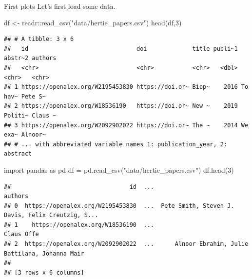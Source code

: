 \documentclass[
  10pt,
  ignorenonframetext,
  aspectratio=169]{beamer}
\newenvironment{Shaded}{\begin{snugshade}}{\end{snugshade}}
\newcommand{\DecValTok}[1]{\textcolor[rgb]{0.86,0.86,0.80}{#1}}
\newcommand{\FunctionTok}[1]{\textcolor[rgb]{0.94,0.94,0.56}{#1}}
\newcommand{\ImportTok}[1]{\textcolor[rgb]{0.80,0.80,0.80}{#1}}
\newcommand{\NormalTok}[1]{\textcolor[rgb]{0.80,0.80,0.80}{#1}}
\newcommand{\OperatorTok}[1]{\textcolor[rgb]{0.94,0.94,0.82}{#1}}
\newcommand{\OtherTok}[1]{\textcolor[rgb]{0.94,0.94,0.56}{#1}}
\newcommand{\SpecialCharTok}[1]{\textcolor[rgb]{0.86,0.64,0.64}{#1}}
\newcommand{\StringTok}[1]{\textcolor[rgb]{0.80,0.58,0.58}{#1}}
\begin{document}
\begin{frame}[fragile]{First plots}
\protect\hypertarget{first-plots}{}
Let's first load some data.

\scriptsize

\begin{Shaded}
\begin{Highlighting}[]
\NormalTok{df }\OtherTok{\textless{}{-}}\NormalTok{ readr}\SpecialCharTok{::}\FunctionTok{read\_csv}\NormalTok{(}\StringTok{"data/hertie\_papers.csv"}\NormalTok{)}
\FunctionTok{head}\NormalTok{(df,}\DecValTok{3}\NormalTok{)}
\end{Highlighting}
\end{Shaded}

\begin{verbatim}
## # A tibble: 3 x 6
##   id                               doi             title publi~1 abstr~2 authors
##   <chr>                            <chr>           <chr>   <dbl> <chr>   <chr>  
## 1 https://openalex.org/W2195453830 https://doi.or~ Biop~    2016 To hav~ Pete S~
## 2 https://openalex.org/W18536190   https://doi.or~ New ~    2019 Politi~ Claus ~
## 3 https://openalex.org/W2092902022 https://doi.or~ The ~    2014 We exa~ Alnoor~
## # ... with abbreviated variable names 1: publication_year, 2: abstract
\end{verbatim}

\begin{Shaded}
\begin{Highlighting}[]
\ImportTok{import}\NormalTok{ pandas }\ImportTok{as}\NormalTok{ pd}
\NormalTok{df }\OperatorTok{=}\NormalTok{ pd.read\_csv(}\StringTok{"data/hertie\_papers.csv"}\NormalTok{)}
\NormalTok{df.head(}\DecValTok{3}\NormalTok{)}
\end{Highlighting}
\end{Shaded}

\begin{verbatim}
##                                  id  ...                                            authors
## 0  https://openalex.org/W2195453830  ...  Pete Smith, Steven J. Davis, Felix Creutzig, S...
## 1    https://openalex.org/W18536190  ...                                         Claus Offe
## 2  https://openalex.org/W2092902022  ...      Alnoor Ebrahim, Julie Battilana, Johanna Mair
## 
## [3 rows x 6 columns]
\end{verbatim}
\end{frame}
\end{document}
